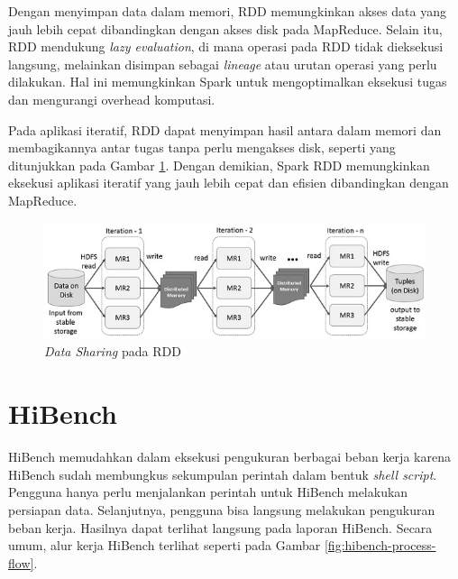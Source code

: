 Dengan menyimpan data dalam memori, RDD memungkinkan akses data yang jauh lebih cepat dibandingkan dengan akses disk pada MapReduce. Selain itu, RDD mendukung \textit{lazy evaluation}, di mana operasi pada RDD tidak dieksekusi langsung, melainkan disimpan sebagai \textit{lineage} atau urutan operasi yang perlu dilakukan. Hal ini memungkinkan Spark untuk mengoptimalkan eksekusi tugas dan mengurangi overhead komputasi.

Pada aplikasi iteratif, RDD dapat menyimpan hasil antara dalam memori dan membagikannya antar tugas tanpa perlu mengakses disk, seperti yang ditunjukkan pada Gambar \ref{fig:iterative_operations_on_spark_rdd}. Dengan demikian, Spark RDD memungkinkan eksekusi aplikasi iteratif yang jauh lebih cepat dan efisien dibandingkan dengan MapReduce.

\begin{figure}[h]
    \centering
    \includegraphics[width=1\textwidth]{figures/ch02/iterative_operations_on_spark_rdd}
    \caption{\textit{Data Sharing} pada RDD \cite{ApacheSparkRDD}}
    \label{fig:iterative_operations_on_spark_rdd}
\end{figure}

\section{HiBench}
HiBench memudahkan dalam eksekusi pengukuran berbagai beban kerja karena HiBench sudah membungkus sekumpulan perintah dalam bentuk \textit{shell script}\cite{samadiPerformanceComparisonHadoop2018}. Pengguna hanya perlu menjalankan perintah untuk HiBench melakukan persiapan data. Selanjutnya, pengguna bisa langsung melakukan pengukuran beban kerja. Hasilnya dapat terlihat langsung pada laporan HiBench. Secara umum, alur kerja HiBench terlihat seperti pada Gambar \ref{fig:hibench-process-flow}.

